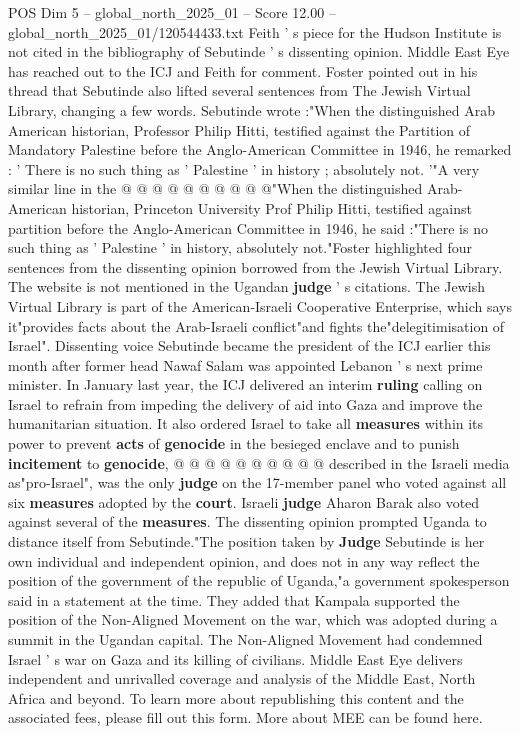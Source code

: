 \begin{textsample}{POS Dim 5 – global\_north\_2025\_01 – Score 12.00 – global\_north\_2025\_01/120544433.txt}
Feith ' s piece for the Hudson Institute is not cited in the bibliography of Sebutinde ' s dissenting opinion.
Middle East Eye has reached out to the ICJ and Feith for comment.
Foster pointed out in his thread that Sebutinde also lifted several sentences from The Jewish Virtual Library, changing a few words.
Sebutinde wrote :"When the distinguished Arab American historian, Professor Philip Hitti, testified against the Partition of Mandatory Palestine before the Anglo-American Committee in 1946, he remarked : ' There is no such thing as ' Palestine ' in history ; absolutely not. '"A very similar line in the @ @ @ @ @ @ @ @ @ @"When the distinguished Arab-American historian, Princeton University Prof Philip Hitti, testified against partition before the Anglo-American Committee in 1946, he said :"There is no such thing as ' Palestine ' in history, absolutely not."Foster highlighted four sentences from the dissenting opinion borrowed from the Jewish Virtual Library.
The website is not mentioned in the Ugandan \textbf{judge} ' s citations.
The Jewish Virtual Library is part of the American-Israeli Cooperative Enterprise, which says it"provides facts about the Arab-Israeli conflict"and fights the"delegitimisation of Israel".
Dissenting voice Sebutinde became the president of the ICJ earlier this month after former head Nawaf Salam was appointed Lebanon ' s next prime minister.
In January last year, the ICJ delivered an interim \textbf{ruling} calling on Israel to refrain from impeding the delivery of aid into Gaza and improve the humanitarian situation.
It also ordered Israel to take all \textbf{measures} within its power to prevent \textbf{acts} of \textbf{genocide} in the besieged enclave and to punish \textbf{incitement} to \textbf{genocide}, @ @ @ @ @ @ @ @ @ @ described in the Israeli media as"pro-Israel", was the only \textbf{judge} on the 17-member panel who voted against all six \textbf{measures} adopted by the \textbf{court}.
Israeli \textbf{judge} Aharon Barak also voted against several of the \textbf{measures}.
The dissenting opinion prompted Uganda to distance itself from Sebutinde."The position taken by \textbf{Judge} Sebutinde is her own individual and independent opinion, and does not in any way reflect the position of the government of the republic of Uganda,"a government spokesperson said in a statement at the time.
They added that Kampala supported the position of the Non-Aligned Movement on the war, which was adopted during a summit in the Ugandan capital.
The Non-Aligned Movement had condemned Israel ' s war on Gaza and its killing of civilians.
Middle East Eye delivers independent and unrivalled coverage and analysis of the Middle East, North Africa and beyond.
To learn more about republishing this content and the associated fees, please fill out this form.
More about MEE can be found here.

\end{textsample}
